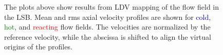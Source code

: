 \begin{figure}

\centering



\caption[Effect of preheat temperature on the LSB flow field - I]{The plots above show results from LDV mapping of the flow field in the LSB. Mean and rms axial velocity profiles are shown for \textcolor{blue}{cold}, \textcolor{green}{hot}, and \textcolor{red}{reacting} flow fields. The velocities are normalized by the reference velocity, while the abscissa is shifted to align the virtual origins of the profiles.}

\label{fig:temperatureLDVResults}

\end{figure}

